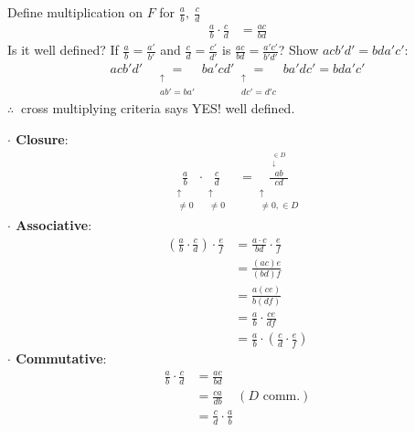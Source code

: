 \begin{theorem}
    Define multiplication on $F$ for $\frac{a}{b}, \ \frac{c}{d}$
    \begin{align}
        \frac{a}{b} \cdot \frac{c}{d}&= \frac{ac}{bd} \nonumber
    \end{align}
    Is it well defined? If $\frac{a}{b}=\frac{a'}{b'}$ and $\frac{c}{d}=\frac{c'}{d'}$ is
    $\frac{ac}{bd}=\frac{a'c'}{b'd'}$? Show $acb'd'=bda'c'$:
    \begin{align}
        acb'd'&\underset{\substack{\uparrow \\ ab'=ba'}}{=}ba'cd'\underset{\substack{\uparrow \\ dc'=d'c}}{=}ba'dc'=bda'c'\nonumber
    \end{align}
    $\therefore \ $ cross multiplying criteria says YES! well defined.

    \noindent \textbf{$\cdot$ Closure}: \\
    \begin{align}
        \underset{\substack{\uparrow \\ \neq 0}}{\frac{a}{b}}\cdot  \underset{\substack{\uparrow \\ \neq 0}}{\frac{c}{d}} &= \underset{\substack{\uparrow \\ \neq 0, \in D}}{\frac{\overset{\substack{\in D \\ \downarrow}}{ab}}{cd}}\nonumber
    \end{align}
    \newpage
    \noindent \textbf{$\cdot$ Associative}: \\
    \begin{align}
        \left(\frac{a}{b}\cdot \frac{c}{d} \right) \cdot \frac{e}{f} &= \frac{a\cdot c}{bd} \cdot \frac{e}{f}\nonumber \\
        &= \frac{(ac)e}{(bd)f}\nonumber \\
        &= \frac{a(ce)}{b(df)} \nonumber \\
        &= \frac{a}{b}\cdot \frac{ce}{df} \nonumber \\
        &= \frac{a}{b} \cdot \left(\frac{c}{d}\cdot \frac{e}{f}\right) \nonumber
    \end{align}
    \noindent \textbf{$\cdot$ Commutative}: \\
    \begin{align}
        \frac{a}{b}\cdot \frac{c}{d}&= \frac{ac}{bd} \nonumber \\
        &= \frac{ca}{db} \ \ \ \ \ (D\text{ comm.}) \nonumber \\
        &= \frac{c}{d}\cdot \frac{a}{b} \nonumber
    \end{align}

\end{theorem}
